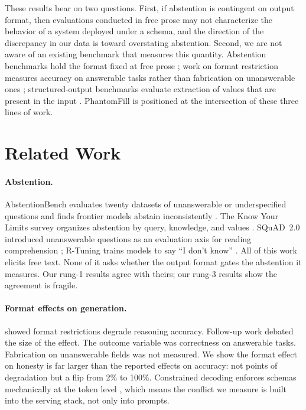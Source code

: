 \documentclass[11pt]{article}
\newcommand{\pf}{PhantomFill}
\begin{document}
These results bear on two questions. First, if abstention is contingent on output format, then evaluations conducted in free prose may not characterize the behavior of a system deployed under a schema, and the direction of the discrepancy in our data is toward overstating abstention. Second, we are not aware of an existing benchmark that measures this quantity. Abstention benchmarks hold the format fixed at free prose \citep{abstentionbench}; work on format restriction measures accuracy on answerable tasks rather than fabrication on unanswerable ones \citep{letmespeak}; structured-output benchmarks evaluate extraction of values that are present in the input \citep{sob,llmstructbench}. \pf{} is positioned at the intersection of these three lines of work.

\section{Related Work}

\paragraph{Abstention.} AbstentionBench evaluates twenty datasets of unanswerable or underspecified questions and finds frontier models abstain inconsistently \citep{abstentionbench}. The Know Your Limits survey organizes abstention by query, knowledge, and values \citep{knowyourlimits}. SQuAD~2.0 introduced unanswerable questions as an evaluation axis for reading comprehension \citep{squad2}; R-Tuning trains models to say ``I don't know'' \citep{rtuning}. All of this work elicits free text. None of it asks whether the output format gates the abstention it measures. Our rung-1 results agree with theirs; our rung-3 results show the agreement is fragile.

\paragraph{Format effects on generation.} \citet{letmespeak} showed format restrictions degrade reasoning accuracy. Follow-up work debated the size of the effect. The outcome variable was correctness on answerable tasks. Fabrication on unanswerable fields was not measured. We show the format effect on honesty is far larger than the reported effects on accuracy: not points of degradation but a flip from 2\% to 100\%. Constrained decoding enforces schemas mechanically at the token level \citep{outlines}, which means the conflict we measure is built into the serving stack, not only into prompts.
\end{document}
